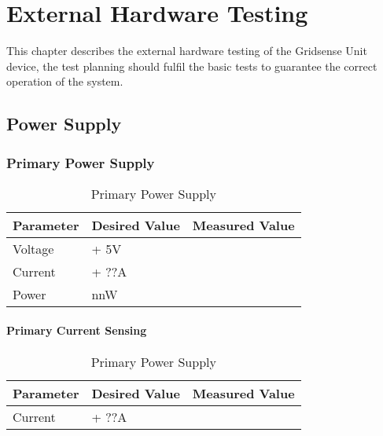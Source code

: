 \chapter{External Hardware Testing}
\label{chap: External Hardware Testing}

This chapter describes the external hardware testing of the Gridsense Unit device, the test planning should fulfil the basic tests to guarantee the correct operation of the system.\\

\section{Power Supply}
\label{sec: Power Supply}
\subsection{Primary Power Supply}
\label{subsec: Primary Power Supply}

\begin{table}[H]
  \centering
  \begin{tabular}{|l|l|l|}
    \hline
    \textbf{Parameter}    &  \textbf{Desired Value}   &  \textbf{Measured Value}  \\
    \hline
    Voltage  & + 5V   & \\
    \hline
    Current  & + ??A  & \\
    \hline
    Power    & nnW    & \\
    \hline
  \end{tabular}
  \caption{Primary Power Supply}
  \label{tab: Primary Power Supply}
\end{table}

\subsubsection{Primary Current Sensing}
\label{subsubsec: Primary Current Sensing}

\begin{table}[H]
  \centering
  \begin{tabular}{|l|l|l|}
    \hline
    \textbf{Parameter}    &  \textbf{Desired Value}   &  \textbf{Measured Value}  \\
    \hline
    Current  & + ??A   & \\
    \hline
  \end{tabular}
  \caption{Primary Power Supply}
  \label{tab: Primary Power Supply}
\end{table}

